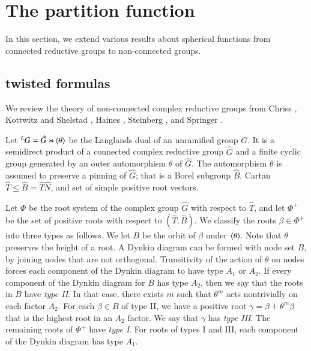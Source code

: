 \section{The partition function}


In this section, we extend various results about spherical functions
from connected reductive groups to non-connected groups.



\subsection{twisted formulas}

We review the theory of non-connected complex reductive groups from
 Chriss \cite{chriss}, Kottwitz and Shelstad \cite{kottwitz1999foundations}, 
Haines \cite{haines2016dualities},
Steinberg \cite{steinberg1968endomorphisms}, and Springer \cite{springer2010linear}.



Let ${}^LG = \hat G \rtimes \langle{\theta}\rangle$ be the Langlands dual of an unramified group $G$.
It is a semidirect product of a connected complex reductive group $\hat G$ and a finite cyclic group
generated by an outer automorphism $\theta$ of $\hat G$.  The automorphism $\theta$ is assumed
to preserve a pinning of $\hat G$; that is a Borel subgroup $\hat B$, Cartan $\hat T\le \hat B=\hat T\hat N$, and
set of simple positive root vectors.  

Let $\Phi$ be the root system of the complex group $\hat G$ with respect to $\hat T$, and let
$\Phi^+$ be the set of positive roots with respect to $(\hat T,\hat B)$.
 We classify the roots $\beta\in\Phi^+$ into three types as follows.  We let $B$ be the orbit of $\beta$ under
$\langle{\theta}\rangle$.  Note that $\theta$ preserves the height of a root.
A Dynkin diagram can be formed with node set $B$, by joining nodes that are not orthogonal.  
Transitivity of the action of $\theta$ on nodes forces each component of the Dynkin diagram to have type $A_1$
or $A_2$.  If every component of the Dynkin diagram for $B$  has type $A_2$, then we say that the roots in $B$
have {\it type II}.  In that case, there exists $m$ such that  $\theta^m$ acts nontrivially
on each factor $A_2$.   For each $\beta\in B$ of type II, we have a positive root $\gamma = \beta+\theta^m\beta$ that
is the highest root in an $A_2$ factor.  We say that $\gamma$ has {\it type III}.
The remaining roots of $\Phi^+$ have {\it type I}.  For roots of
types I and III, each component of the Dynkin diagram has type $A_1$.

